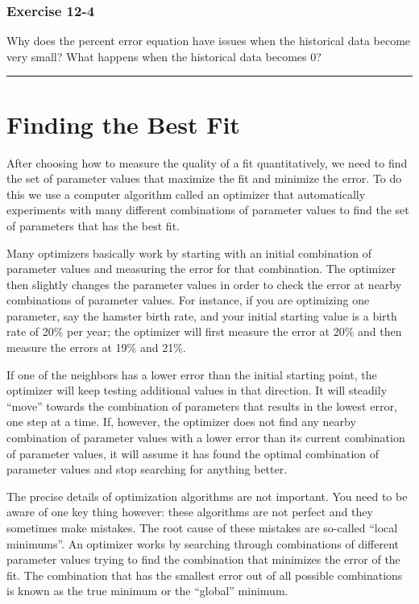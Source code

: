\documentclass[]{memoir}
\begin{document}
\subsubsection{Exercise 12-4}

Why does the percent error equation have issues when the historical data
become very small? What happens when the historical data becomes 0?

\begin{center}\rule{3in}{0.4pt}\end{center}

\section{Finding the Best Fit}

After choosing how to measure the quality of a fit quantitatively, we
need to find the set of parameter values that maximize the fit and
minimize the error. To do this we use a computer algorithm called an
optimizer that automatically experiments with many different
combinations of parameter values to find the set of parameters that has
the best fit.

Many optimizers basically work by starting with an initial combination
of parameter values and measuring the error for that combination. The
optimizer then slightly changes the parameter values in order to check
the error at nearby combinations of parameter values. For instance, if
you are optimizing one parameter, say the hamster birth rate, and your
initial starting value is a birth rate of 20\% per year; the optimizer
will first measure the error at 20\% and then measure the errors at 19\%
and 21\%.

If one of the neighbors has a lower error than the initial starting
point, the optimizer will keep testing additional values in that
direction. It will steadily ``move'' towards the combination of
parameters that results in the lowest error, one step at a time. If,
however, the optimizer does not find any nearby combination of parameter
values with a lower error than its current combination of parameter
values, it will assume it has found the optimal combination of parameter
values and stop searching for anything better.

The precise details of optimization algorithms are not important. You
need to be aware of one key thing however: these algorithms are not
perfect and they sometimes make mistakes. The root cause of these
mistakes are so-called ``local minimums''. An optimizer works by
searching through combinations of different parameter values trying to
find the combination that minimizes the error of the fit. The
combination that has the smallest error out of all possible combinations
is known as the true minimum or the ``global'' minimum.
\end{document}
